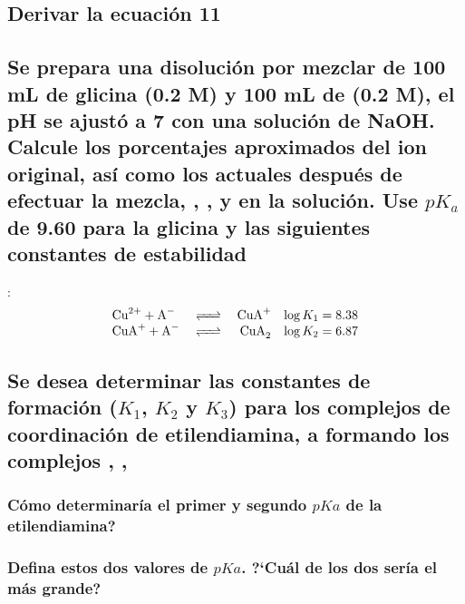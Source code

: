 \documentclass[fleqn,10pt]{SelfArx} %
\begin{document}
	\subsubsection{\ce{[Ni(Gly^-)]^+}}
	\subsubsection{\ce{[Ni(Gly^-)_2]}}
	\subsubsection{}
	
	\subsection{Derivar la ecuaci\'on 11}
	
	\subsection[Se prepara]{Se prepara una disoluci\'on por mezclar de 100 mL de glicina (0.2 M) y 100 mL de  (0.2 M), el pH se ajust\'o a 7 con una soluci\'on de NaOH. Calcule los porcentajes aproximados del ion  original, as\'i como los actuales despu\'es de efectuar la mezcla, , , y  en la soluci\'on. Use $pK_a$ de 9.60 para la glicina y las siguientes constantes de estabilidad}:
	\begin{equation*}
	    \begin{array}{lcrc}
	        \ce{Cu^{2+} + A-} & \ce{<=>} & \ce{CuA+} & \log K_1 = 8.38\\
	        \ce{CuA+ + A-} & \ce{<=>} & \ce{CuA_2} & \log K_2 = 6.87 
	    \end{array}
	\end{equation*}
	
	\subsection{Se desea determinar las constantes de formaci\'on ($K_1$, $K_2$ y $K_3$) para los complejos de coordinaci\'on de etilendiamina, a  formando los complejos , , }
	\subsubsection{C\'omo determinar\'ia el primer y segundo $pKa$ de la etilendiamina?}
	\subsubsection{Defina estos dos valores de $pKa$. ?`Cu\'al de los dos ser\'ia el m\'as grande?}
\end{document}
